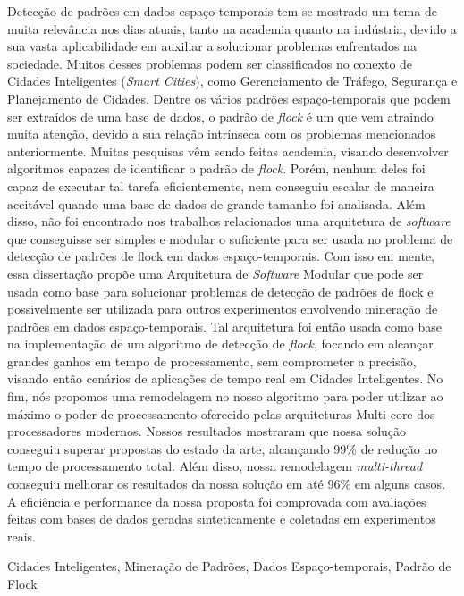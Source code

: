 Detecção de padrões em dados espaço-temporais tem se mostrado um tema de muita relevância nos dias atuais, tanto na
academia quanto na indústria, devido a sua vasta aplicabilidade em auxiliar a solucionar problemas enfrentados na
sociedade. Muitos desses problemas podem ser classificados no conexto de Cidades Inteligentes (\textit{Smart Cities}),
como Gerenciamento de Tráfego, Segurança e Planejamento de Cidades. Dentre os vários padrões espaço-temporais que podem
ser extraídos de uma base de dados, o padrão de \textit{flock} é um que vem atraindo muita atenção, devido a sua relação
intrínseca com os problemas mencionados anteriormente. Muitas pesquisas vêm sendo feitas academia, visando desenvolver
algoritmos capazes de identificar o padrão de \textit{flock}. Porém, nenhum deles foi capaz de executar tal tarefa
eficientemente, nem conseguiu escalar de maneira aceitável quando uma base de dados de grande tamanho foi analisada.
Além disso, não foi encontrado nos trabalhos relacionados uma arquitetura de \textit{software} que conseguisse ser
simples e modular o suficiente para ser usada no problema de detecção de padrões de flock em dados espaço-temporais.
Com isso em mente, essa dissertação propõe uma Arquitetura de \textit{Software} Modular que pode ser usada como base
para solucionar problemas de detecção de padrões de flock e possivelmente ser utilizada para outros experimentos
envolvendo mineração de padrões em dados espaço-temporais. Tal arquitetura foi então usada como base na implementação de
um algoritmo de detecção de \textit{flock}, focando em alcançar grandes ganhos em tempo de processamento, sem
comprometer a precisão, visando então cenários de aplicações de tempo real em Cidades Inteligentes. No fim, nós propomos
uma remodelagem no nosso algoritmo para poder utilizar ao máximo o poder de processamento oferecido pelas arquiteturas
Multi-core dos processadores modernos. Nossos resultados mostraram que nossa solução conseguiu superar propostas do
estado da arte, alcançando 99\% de redução no tempo de processamento total. Além disso, nossa remodelagem
\textit{multi-thread} conseguiu melhorar os resultados da nossa solução em até 96\% em alguns casos. A eficiência e
performance da nossa proposta foi comprovada com avaliações feitas com bases de dados geradas sinteticamente e coletadas
em experimentos reais.

\begin{keywords}
Cidades Inteligentes, Mineração de Padrões, Dados Espaço-temporais, Padrão de Flock
\end{keywords}
